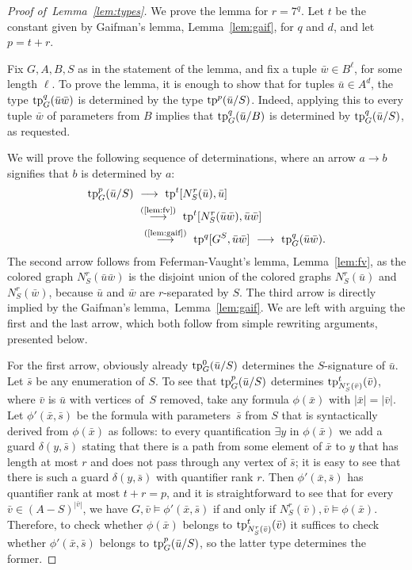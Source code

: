 \begin{proof}[Proof of~Lemma~\ref{lem:types}]
We prove the lemma for $r=7^q$.
Let $t$ be the constant given by Gaifman's lemma, Lemma~\ref{lem:gaif}, for $q$ and $d$, and let $p=t+r$.

Fix $G,A,B,S$ as in the statement of the lemma, and fix a tuple $\bar w\in B^\ell$, for some length $\ell$.
To prove the lemma, it is enough to show that
for tuples $\bar u\in A^d$,
the type $\mathrm{tp}^q_G(\bar u\bar w)$ is determined by the type $\mathrm{tp}^p(\bar u/S)$.
Indeed, applying this to every tuple $\bar w$ of parameters from $B$ implies that $\mathrm{tp}^q_G(\bar u/B)$ is determined by $\mathrm{tp}^q_G(\bar u/S)$, as requested.

We will prove the following sequence of determinations,
where an arrow $a\rightarrow b$ signifies that $b$ is determined by $a$:
\begin{align*}
	\tp^p_G(\bar u/S)
  \ & \longrightarrow\ 
	\tp^{t}[N^r_S(\bar u), \bar u]
  \ \\ &\stackrel{\textrm{(\ref{lem:fv})}}{\longrightarrow}\ 
	\tp^{t}[N^r_S(\bar u\bar w), \bar u\bar w] \\ &\ \stackrel{\textrm{(\ref{lem:gaif})}}\longrightarrow\ 
	\tp^q[G^S, \bar u\bar w] \ \longrightarrow\ 
	\tp^q_G(\bar u\bar w).
\end{align*}
The second arrow follows from Feferman-Vaught's lemma, Lemma~\ref{lem:fv},
as the colored graph $N^r_S(\bar u\bar w)$
is the disjoint union of the colored graphs 
$N^r_S(\bar u)$ and $N^r_S(\bar w)$,
because $\bar u$ and $\bar w$ are $r$-separated by $S$.
The third arrow is directly implied by the Gaifman's lemma,~Lemma~\ref{lem:gaif}.
We are left with arguing the first and the last arrow, which both follow from simple rewriting arguments, presented below.

\medskip
For the first arrow, obviously already $\mathrm{tp}^0_G(\bar u/S)$ determines the $S$-signature of $\bar u$. Let $\bar s$ be any enumeration of $S$.
To see that $\mathrm{tp}^p_G(\bar u/S)$ determines $\mathrm{tp}^{t}_{N^r_S(\bar v)}(\bar v)$, where $\bar v$ is $\bar u$ with vertices of~$S$ removed, take any formula $\phi(\bar x)$ with $|\bar x|=|\bar v|$.
Let $\phi'(\bar x,\bar s)$ be the formula with parameters~$\bar s$ from $S$ that is syntactically derived from $\phi(\bar x)$ as follows: 
to every quantification $\exists y$ in $\phi(\bar x)$ we add a guard $\delta(y,\bar s)$ stating that there is a path from some element of $\bar x$ to $y$ that has length at most $r$ and does not pass through
any vertex of $\bar s$; it is easy to see that there is such a guard $\delta(y,\bar s)$ with quantifier rank $r$.
Then $\phi'(\bar x,\bar s)$ has quantifier rank at most $t+r=p$, and it is straightforward to see that for every $\bar v\in (A-S)^{|\bar v|}$, we have $G,\bar v\models \phi'(\bar x,\bar s)$ if and only if
$N^r_S(\bar v),\bar v\models \phi(\bar x)$. Therefore, to check whether $\phi(\bar x)$ belongs to $\mathrm{tp}^{t}_{N^r_S(\bar v)}(\bar v)$ it suffices to check 
whether $\phi'(\bar x,\bar s)$ belongs to $\mathrm{tp}^p_G(\bar u/S)$, so the latter type determines the former.


\end{proof}
